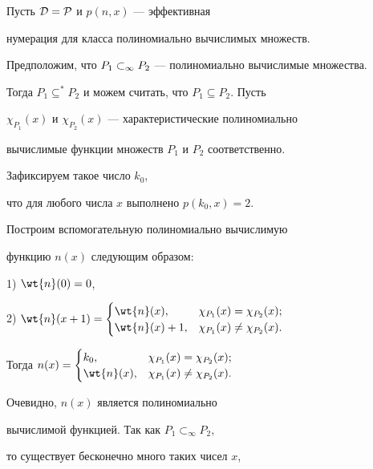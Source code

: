 \begin{pf}


Пусть $\cal{D}=\cal{P}$ и $p(n,x)$ --- эффективная 


нумерация для класса полиномиально вычислимых множеств. 


Предположим, что ${P_1}\subset_\infty{P_2}$ --- полиномиально вычислимые множества.


Тогда $P_1\subseteq^*P_2$ и можем считать, что $P_1\subseteq P_2$. Пусть


$\chi_{P_1}(x)$ и $\chi_{P_2}(x)$ --- характеристические полиномиально


вычислимые функции множеств $P_1$ и $P_2$ соответственно.





Зафиксируем такое число $k_0$, 


что для любого числа $x$ выполнено $p(k_0,x)=2$.





Построим вспомогательную полиномиально вычислимую 


функцию $n(x)$ следующим образом:





1) $\wt{n}(0)=0$,





2) $\wt{n}(x+1)=\begin{cases} \wt{n}(x), &


\chi_{P_1}(x)=\chi_{P_2}(x); \\ \wt{n}(x)+1, &


\chi_{P_1}(x)\ne\chi_{P_2}(x). \end{cases}$





Тогда $n(x)=\begin{cases} k_0, & \chi_{P_1}(x)=


\chi_{P_2}(x); \\ \wt{n}(x), & \chi_{P_1}(x)\ne


\chi_{P_2}(x). \end{cases}$





\noindent{}Очевидно, $n(x)$ является полиномиально


вычислимой функцией. Так как $P_1\subset_\infty P_2$,


то существует бесконечно много таких чисел $x$,



\end{pf}
